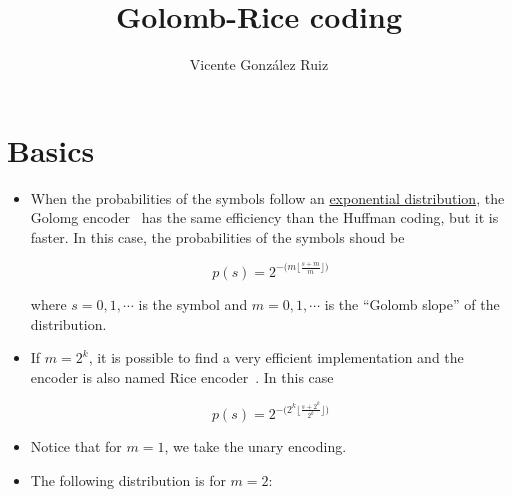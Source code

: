 
\title{Golomb-Rice coding}

\author{Vicente González Ruiz}

\maketitle

\section{Basics}  
\begin{itemize}
\item
  When the probabilities of the symbols follow an
  \href{https://en.wikipedia.org/wiki/Exponential_distribution}{exponential
  distribution}, the Golomg encoder~\cite{golomb1966run} has the same efficiency than the
  Huffman coding, but it is faster. In this case, the probabilities of
  the symbols shoud be

  \begin{equation}
    p(s) =
    2^{\displaystyle-\Big(\displaystyle m\big\lfloor\displaystyle\frac{s+m}{m}\big\rfloor\Big)}
    \tag{Eq:Golomb}
  \end{equation}

  where \(s=0,1,\cdots\) is the symbol and \(m=0,1,\cdots\) is the
  ``Golomb slope'' of the distribution.
\item
  If \(m=2^k\), it is possible to find a very efficient implementation
  and the encoder is also named Rice encoder~\cite{rice1971adaptive}. In this case

  \begin{equation}
    p(s) =
    2^{\displaystyle-\Big(2^k \displaystyle\big\lfloor\displaystyle\frac{s+2^k}{2^k}\big\rfloor\Big)}
    \tag{Eq:Rice}
    \label{eq:Rice}
  \end{equation}
\end{itemize}


\begin{itemize}
\item
  Notice that for \(m=1\), we take the unary encoding.
\item
  The following distribution is for \(m=2\):
\end{itemize}

